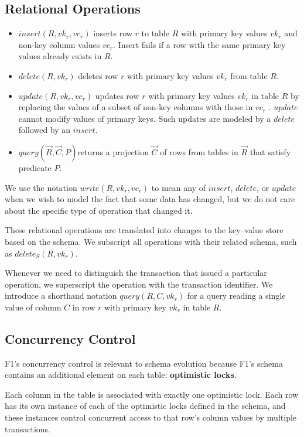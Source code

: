 \documentclass[11pt]{article}
\begin{document}
\subsection{Relational Operations}
\label{sec:org0ca3912}
\begin{itemize}
\item \(insert(R, vk_r, vc_r)\) inserts row \(r\) to table \(R\) with primary key values \(vk_r\) and
non-key column values \(vc_r\). Insert fails if a row with the same primary key values already
exists in \(R\).
\item \(delete(R, vk_r)\) deletes row \(r\) with primary key values \(vk_r\) from table \(R\).
\item \(update(R, vk_r , vc_r)\) updates row \(r\) with primary key values \(vk_r\) in table \(R\) by
replacing the values of a subset of non-key columns with those in \(vc_r\) . \(update\) cannot
modify values of primary keys. Such updates are modeled by a \(delete\) followed by an \(insert\).
\item \(query(\vec{R}, \vec{C}, P)\)returns a projection \(\vec{C}\) of rows from tables in \(\vec{R}\)
that satisfy predicate \(P\).
\end{itemize}

We use the notation \(write(R, vk_r, vc_r)\) to mean any of \(insert\), \(delete\), or \(update\) when
we wish to model the fact that some data has changed, but we do not care about the specific type of
operation that changed it.

These relational operations are translated into changes to the key–value store based on the schema. We
subscript all operations with their related schema, such as \(delete_S(R, vk_r)\).

Whenever we need to distinguish the transaction that issued a particular operation, we superscript the
operation with the transaction identifier. We introduce a shorthand notation \(query(R, C, vk_r)\) for
a query reading a single value of column \(C\) in row \(r\) with primary key \(vk_r\) in table \(R\).
\subsection{Concurrency Control}
\label{sec:orgf1b0b64}
F1’s concurrency control is relevant to schema evolution because F1's schema contains an additional
element on each table: \textbf{optimistic locks}.

Each column in the table is associated with exactly one optimistic lock. Each row has its own instance
of each of the optimistic locks defined in the schema, and these instances control concurrent access
to that row’s column values by multiple transactions.
\end{document}
